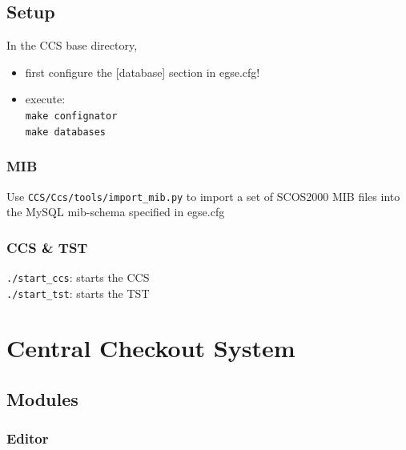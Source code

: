 \section{Setup}
In the CCS base directory,

\begin{itemize}
  \item first configure the [database] section in egse.cfg!
  \item execute:\\
   \texttt{make confignator}\\
   \texttt{make databases}
  \end{itemize}

    
\subsection{MIB}
Use \texttt{CCS/Ccs/tools/import\_mib.py} to import a set of SCOS2000 MIB files into the MySQL mib-schema specified in egse.cfg

\subsection{CCS \& TST}
\texttt{./start\_ccs}: starts the CCS\\
\texttt{./start\_tst}: starts the TST

\chapter{Central Checkout System}

\section{Modules}
\subsection{Editor}

